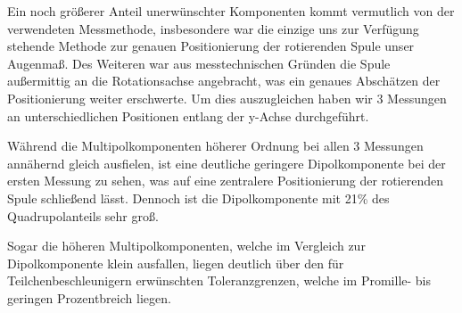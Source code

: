 \documentclass[bigchapter,colorback,accentcolor=tud4b,linedtoc,11pt]{tudreport}
\begin{document}
Ein noch größerer Anteil unerwünschter Komponenten kommt vermutlich von der verwendeten Messmethode, insbesondere war die einzige uns zur Verfügung stehende Methode zur genauen Positionierung der rotierenden Spule unser Augenmaß. Des Weiteren war aus messtechnischen Gründen die Spule außermittig an die Rotationsachse angebracht, was ein genaues Abschätzen der Positionierung weiter erschwerte. Um dies auszugleichen haben wir 3 Messungen an unterschiedlichen Positionen entlang der y-Achse durchgeführt.

\begin{center}
\begin{figure}[H]
\end{figure}
\end{center}

Während die Multipolkomponenten höherer Ordnung bei allen 3 Messungen annähernd gleich ausfielen, ist eine deutliche geringere Dipolkomponente bei der ersten Messung zu sehen, was auf eine zentralere Positionierung der rotierenden Spule schließend lässt. Dennoch ist die Dipolkomponente mit 21\% des Quadrupolanteils sehr groß.

Sogar die höheren Multipolkomponenten, welche im Vergleich zur Dipolkomponente klein ausfallen, liegen deutlich über den für Teilchenbeschleunigern erwünschten Toleranzgrenzen, welche im Promille- bis geringen Prozentbreich liegen.
\end{document}
